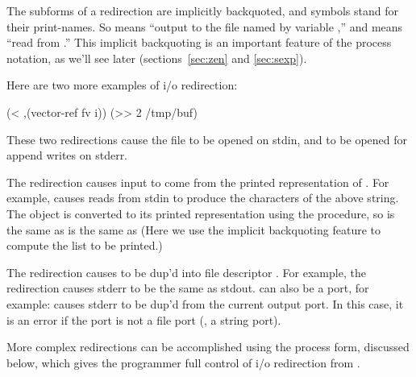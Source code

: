 The subforms of a redirection are implicitly backquoted, 
and symbols stand for their print-names. 
So  means 
``output to the file named by {\Scheme} variable ,'' 
and  means ``read from  .''
This implicit backquoting is an important feature of the process notation,
as we'll see later (sections~\ref{sec:zen} and \ref{sec:sexp}).

Here are two more examples of i/o redirection:
%
\begin{center}
\begin{codebox}
(< ,(vector-ref fv i)) 
(>> 2 /tmp/buf)\end{codebox}
\end{center}
%
These two redirections cause the file  to be opened on stdin, and
 to be opened for append writes on stderr.

The redirection  causes input to come from the 
printed representation of . 
For example,
causes reads from stdin to produce the characters of the above string.
The object is converted to its printed representation using the 
procedure, so
is the same as
is the same as
(Here we use the implicit backquoting feature to compute the list to 
be printed.)

The redirection  causes  
to be dup'd into file descriptor .
For example, the redirection
causes stderr to be the same as stdout. 
 can also be a port, for example:
causes stderr to be dup'd from the current output port. 
In this case,  it is an error if the port is not a file port
(\eg, a string port). 

More complex redirections can be accomplished using the 
process form, discussed below, which gives the programmer full control
of i/o redirection from {\Scheme}.

